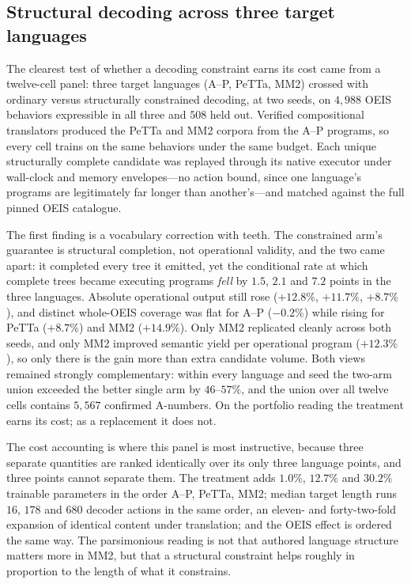 \documentclass[11pt]{article}
\begin{document}
\subsection{Structural decoding across three target languages}
\label{sec:structural-decoding-panel}

The clearest test of whether a decoding constraint earns its cost came from a twelve-cell
panel: three target languages (A--P, PeTTa, MM2) crossed with ordinary versus
structurally constrained decoding, at two seeds, on $4{,}988$ OEIS behaviors expressible
in all three and $508$ held out.  Verified compositional translators produced the PeTTa
and MM2 corpora from the A--P programs, so every cell trains on the same behaviors under
the same budget.  Each unique structurally complete candidate was replayed through its
native executor under wall-clock and memory envelopes---no action bound, since one
language's programs are legitimately far longer than another's---and matched against the
full pinned OEIS catalogue.

The first finding is a vocabulary correction with teeth.  The constrained arm's guarantee
is structural completion, not operational validity, and the two came apart: it completed
every tree it emitted, yet the conditional rate at which complete trees became executing
programs \emph{fell} by $1.5$, $2.1$ and $7.2$ points in the three languages.  Absolute
operational output still rose ($+12.8\%$, $+11.7\%$, $+8.7\%$), and distinct whole-OEIS
coverage was flat for A--P ($-0.2\%$) while rising for PeTTa ($+8.7\%$) and MM2
($+14.9\%$).  Only MM2 replicated cleanly across both seeds, and only MM2 improved
semantic yield per operational program ($+12.3\%$), so only there is the gain more than
extra candidate volume.  Both views remained strongly complementary: within every
language and seed the two-arm union exceeded the better single arm by $46$--$57\%$, and
the union over all twelve cells contains $5{,}567$ confirmed A-numbers.  On the portfolio
reading the treatment earns its cost; as a replacement it does not.

The cost accounting is where this panel is most instructive, because three separate
quantities are ranked identically over its only three language points, and three points
cannot separate them.  The treatment adds $1.0\%$, $12.7\%$ and $30.2\%$ trainable
parameters in the order A--P, PeTTa, MM2; median target length runs $16$, $178$ and $680$
decoder actions in the same order, an eleven- and forty-two-fold expansion of identical
content under translation; and the OEIS effect is ordered the same way.  The parsimonious
reading is not that authored language structure matters more in MM2, but that a
structural constraint helps roughly in proportion to the length of what it constrains.
\end{document}
